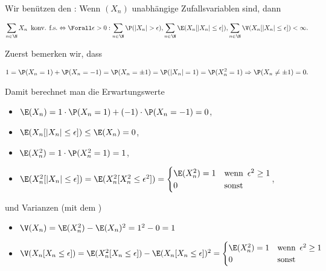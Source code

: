 \begin{solution}

Wir benützen den : Wenn $(X_n)$ unabhängige Zufallsvariablen sind, dann

\begin{align*}
  \sum_{n \in \N} X_n
  \enspace \text{konv. f.s.}
  \Leftrightarrow
  \Forall \epsilon > 0:
  \sum_{n \in \N} \P(|X_n| > \epsilon),
  \sum_{n \in \N} \E(X_n [|X_n| \leq \epsilon]),
  \sum_{n \in \N} \V(X_n [|X_n| \leq \epsilon])
  < \infty.
\end{align*}

Zuerst bemerken wir, dass

\begin{align*}
  1
  =
  \P(X_n = 1) + \P(X_n = -1)
  =
  \P(X_n = \pm 1)
  =
  \P(|X_n| = 1)
  =
  \P(X_n^2 = 1)
  \Rightarrow
  \P(X_n \neq \pm 1) = 0.
\end{align*}

Damit berechnet man die Erwartungswerte

\begin{itemize}

  \item $\E(X_n) = 1 \cdot \P(X_n = 1) + (-1) \cdot \P(X_n = -1) = 0$,

  \item $\E(X_n [|X_n| \leq \epsilon]) \leq \E(X_n) = 0$,

  \item $\E(X_n^2) = 1 \cdot \P(X_n^2 = 1) = 1$,

  \item $\E(X_n^2 [|X_n| \leq \epsilon]) = \E(X_n^2 [X_n^2 \leq \epsilon^2]) =
  \begin{cases}
    \E(X_n^2) = 1 & \text{wenn} \enspace \epsilon^2 \geq 1 \\
    0             & \text{sonst}
  \end{cases}$,

\end{itemize}

und Varianzen (mit dem )

\begin{itemize}

  \item $\V(X_n) = \E(X_n^2) - \E(X_n)^2 = 1^2 - 0 = 1$

  \item $\V(X_n [X_n \leq \epsilon]) = \E(X_n^2 [X_n \leq \epsilon]) - \E(X_n [X_n \leq \epsilon])^2 =
  \begin{cases}
    \E(X_n^2) = 1 & \text{wenn} \enspace \epsilon^2 \geq 1 \\
    0             & \text{sonst}
  \end{cases}$


\end{itemize}
\end{solution}
